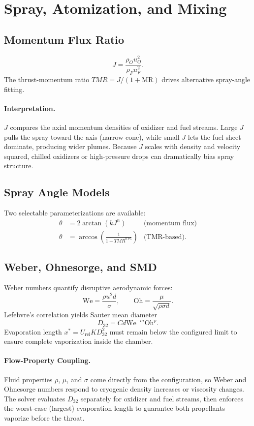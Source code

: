 \documentclass[12pt]{article}
\begin{document}
\section{Spray, Atomization, and Mixing}

\subsection{Momentum Flux Ratio}
\[
J = \frac{\rho_O u_O^2}{\rho_F u_F^2}.
\]
The thrust-momentum ratio $TMR = J / (1+\text{MR})$ drives alternative spray-angle fitting.

\paragraph{Interpretation.}  $J$ compares the axial momentum densities of oxidizer and fuel streams.  Large $J$ pulls the spray toward the axis (narrow cone), while small $J$ lets the fuel sheet dominate, producing wider plumes.  Because $J$ scales with density and velocity squared, chilled oxidizers or high-pressure drops can dramatically bias spray structure.

\subsection{Spray Angle Models}
Two selectable parameterizations are available:
\begin{align*}
\theta &= 2 \arctan\!\left( k J^n \right) & \text{(momentum flux)} \\
\theta &= \arccos\!\left( \frac{1}{1 + TMR^{0.75}} \right) & \text{(TMR-based)}.
\end{align*}

\subsection{Weber, Ohnesorge, and SMD}
Weber numbers quantify disruptive aerodynamic forces:
\[
\text{We} = \frac{\rho u^2 d}{\sigma},
\qquad
\text{Oh} = \frac{\mu}{\sqrt{\rho \sigma d}}.
\]
Lefebvre's correlation yields Sauter mean diameter
\[
D_{32} = C d \text{We}^{-m} \text{Oh}^p.
\]
Evaporation length $x^* = U_{\text{rel}} K D_{32}^2$ must remain below the configured limit to ensure complete vaporization inside the chamber.

\paragraph{Flow-Property Coupling.}  Fluid properties $\rho$, $\mu$, and $\sigma$ come directly from the configuration, so Weber and Ohnesorge numbers respond to cryogenic density increases or viscosity changes.  The solver evaluates $D_{32}$ separately for oxidizer and fuel streams, then enforces the worst-case (largest) evaporation length to guarantee both propellants vaporize before the throat.
\end{document}
